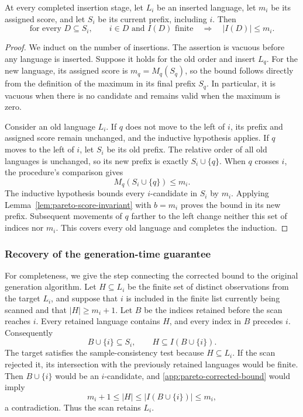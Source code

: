 \begin{suppprop}
At every completed insertion stage, let $L_i$ be an inserted language,
let $m_i$ be its assigned score, and let $S_i$ be its current prefix,
including $i$. Then
\begin{equation}
\label{app:pareto-corrected-bound}
 \text{for every }D\subseteq S_i,\qquad
 i\in D\text{ and }I(D)\text{ finite}
 \quad\Longrightarrow\quad |I(D)|\le m_i.
\end{equation}
\end{suppprop}
\begin{proof}
We induct on the number of insertions. The assertion is vacuous
before any language is inserted. Suppose it holds for the old
order and insert $L_q$.
For the new language, its assigned score is $m_q=M_q(S_q)$, so the
bound follows directly from the definition of the maximum in its
final prefix $S_q$. In particular, it is vacuous when there is no
candidate and remains valid when the maximum is zero.

Consider an old language $L_i$. If $q$ does not move to the left of
$i$, its prefix and assigned score remain unchanged, and the
inductive hypothesis applies. If $q$ moves to the left of $i$, let
$S_i$ be its old prefix. The relative order of all old languages
is unchanged, so its new prefix is exactly $S_i\cup\{q\}$.
When $q$ crosses $i$, the procedure's comparison gives
\[
 M_q(S_i\cup\{q\})\le m_i.
\]
The inductive hypothesis bounds every $i$-candidate in $S_i$ by
$m_i$. Applying Lemma~\ref{lem:pareto-score-invariant} with
$b=m_i$ proves the bound in its new prefix. Subsequent movements
of $q$ farther to the left change neither this set of indices nor
$m_i$. This covers every old language and completes the induction.
\end{proof}

\subsubsection{Recovery of the generation-time guarantee}

For completeness, we give the step connecting the corrected bound
to the original generation algorithm. Let $H\subseteq L_i$ be the
finite set of distinct observations from the target $L_i$, and suppose
that $i$ is included in the finite list currently being scanned and
that $|H|\ge m_i+1$. Let $B$ be the indices retained before the
scan reaches $i$. Every retained language contains $H$, and every
index in $B$ precedes $i$. Consequently
\[
 B\cup\{i\}\subseteq S_i,
 \qquad
 H\subseteq I(B\cup\{i\}).
\]
The target satisfies the sample-consistency test because
$H\subseteq L_i$. If the scan rejected it, its intersection with
the previously retained languages would be finite. Then
$B\cup\{i\}$ would be an $i$-candidate, and
\eqref{app:pareto-corrected-bound} would imply
\[
 m_i+1\le |H|
       \le |I(B\cup\{i\})|
       \le m_i,
\]
a contradiction. Thus the scan retains $L_i$.

